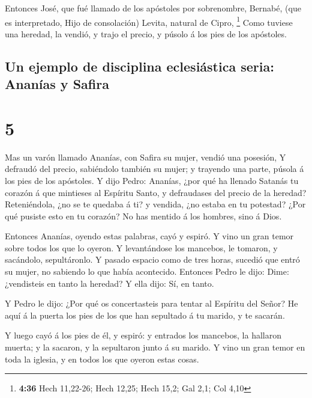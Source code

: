  Entonces José, que fué llamado de los apóstoles por
sobrenombre, Bernabé, (que es interpretado, Hijo de consolación) Levita,
natural de Cipro, \footnote{\textbf{4:36} Hech 11,22-26; Hech 12,25;
  Hech 15,2; Gal 2,1; Col 4,10}  Como tuviese una
heredad, la vendió, y trajo el precio, y púsolo á los pies de los
apóstoles.

\hypertarget{un-ejemplo-de-disciplina-eclesiuxe1stica-seria-ananuxedas-y-safira}{%
\subsection{Un ejemplo de disciplina eclesiástica seria: Ananías y
Safira}\label{un-ejemplo-de-disciplina-eclesiuxe1stica-seria-ananuxedas-y-safira}}

\hypertarget{section-4}{%
\section{5}\label{section-4}}

 Mas un varón llamado Ananías, con Safira su mujer, vendió
una posesión,  Y defraudó del precio, sabiéndolo también
su mujer; y trayendo una parte, púsola á los pies de los apóstoles.
 Y dijo Pedro: Ananías, ¿por qué ha llenado Satanás tu
corazón á que mintieses al Espíritu Santo, y defraudases del precio de
la heredad?  Reteniéndola, ¿no se te quedaba á ti? y
vendida, ¿no estaba en tu potestad? ¿Por qué pusiste esto en tu corazón?
No has mentido á los hombres, sino á Dios.

 Entonces Ananías, oyendo estas palabras, cayó y espiró. Y
vino un gran temor sobre todos los que lo oyeron.  Y
levantándose los mancebos, le tomaron, y sacándolo, sepultáronlo.
 Y pasado espacio como de tres horas, sucedió que entró su
mujer, no sabiendo lo que había acontecido.  Entonces
Pedro le dijo: Dime: ¿vendisteis en tanto la heredad? Y ella dijo: Sí,
en tanto.

 Y Pedro le dijo: ¿Por qué os concertasteis para tentar al
Espíritu del Señor? He aquí á la puerta los pies de los que han
sepultado á tu marido, y te sacarán.

 Y luego cayó á los pies de él, y espiró: y entrados los
mancebos, la hallaron muerta; y la sacaron, y la sepultaron junto á su
marido.  Y vino un gran temor en toda la iglesia, y en
todos los que oyeron estas cosas.

